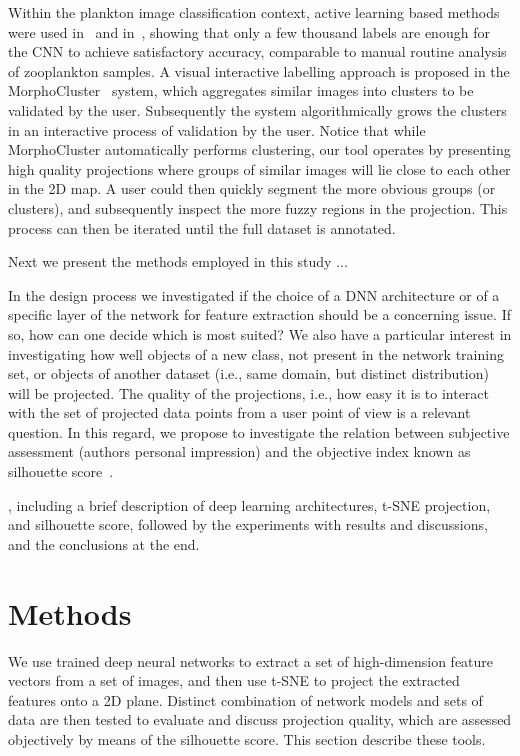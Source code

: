 \documentclass[sn-basic]{sn-jnl}%
\theoremstyle{thmstyleone}%
\theoremstyle{thmstyletwo}%
\theoremstyle{thmstylethree}%
\begin{document}
Within the plankton image classification context, active learning based methods were used in~\citep{luo-paper-al} and in~\citep{bochinski-paper}, showing that only a few thousand labels are enough for the CNN to achieve satisfactory accuracy, comparable to manual routine analysis of zooplankton samples. A visual interactive labelling approach is proposed in the MorphoCluster~\citep{morphocluster-paper} system, which aggregates similar images into clusters to be validated by the user. Subsequently the system algorithmically grows the clusters in an interactive process of validation by the user. Notice that while MorphoCluster automatically performs clustering, our tool operates by presenting high quality projections where groups of similar images will lie close to each other in the 2D map. A user could then quickly segment the more obvious groups (or clusters), and subsequently inspect the more fuzzy regions in the projection. This process can then be iterated until the full dataset is annotated.

Next we present the methods employed in this study ...

In the design process we investigated if the choice of a DNN architecture or of a specific layer of the network for feature extraction should be a concerning issue. If so, how can one decide which is most suited? We also have a particular interest in investigating how well objects of a new class, not present in the network training set, or objects of another dataset (i.e., same domain, but distinct distribution) will be projected. The quality of the projections, i.e., how easy it is to interact with the set of projected data points from a user point of view is a relevant question. In this regard, we propose to investigate the relation between subjective assessment (authors personal impression) and the objective index known as silhouette score~\citep{rousseeuw-silhouette}.

, including a brief description of deep learning architectures, t-SNE projection, and silhouette score, followed by the experiments with results and discussions, and the conclusions at the end.


\section{Methods}

We use trained deep neural networks to extract a set of high-dimension feature vectors from a set of images, and then use t-SNE to project the extracted features onto a 2D plane. Distinct combination of network models and sets of data are then tested to evaluate and discuss projection quality, which are assessed objectively by means of the silhouette score. This section describe these tools.
\end{document}
